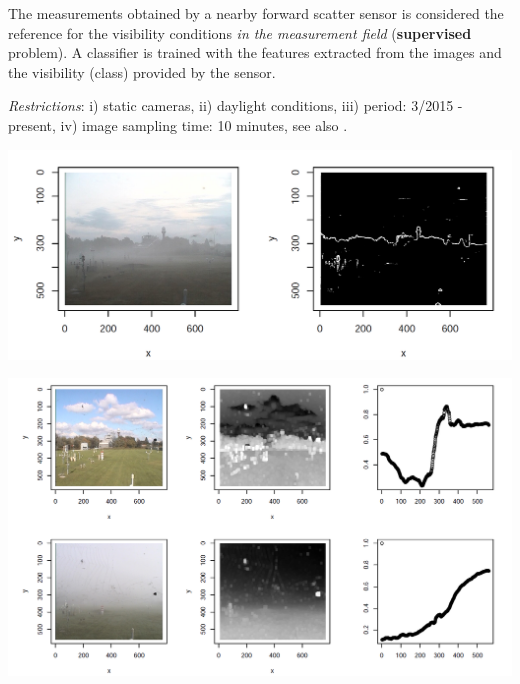 \documentclass{article}
\begin{document}
The measurements obtained by a nearby forward scatter sensor is considered the
reference for the visibility conditions \emph{in the measurement field}
(\textbf{supervised} problem).\newline
A classifier is trained with the features extracted from the images and the 
visibility (class) provided by the sensor.
\vspace*{0.8cm}

\textit{Restrictions}: 
i) static cameras,
ii) daylight conditions,
iii) period: 3/2015 - present, 
iv) image sampling time: 10 minutes,
see also \cite{Wauben.Roth2016}.




\begin{minipage}[b]{\columnwidth}
	\begin{center}
	\includegraphics[width=0.95\columnwidth]{edges}
	\label{figEdges}
	\end{center}
\end{minipage}

\begin{minipage}[b]{\columnwidth}
	\begin{center}
	\includegraphics[width=0.95\columnwidth]{transmission}
	\label{figTransmission}
	\end{center}
\end{minipage}
\vspace*{-5cm}
\end{document}
